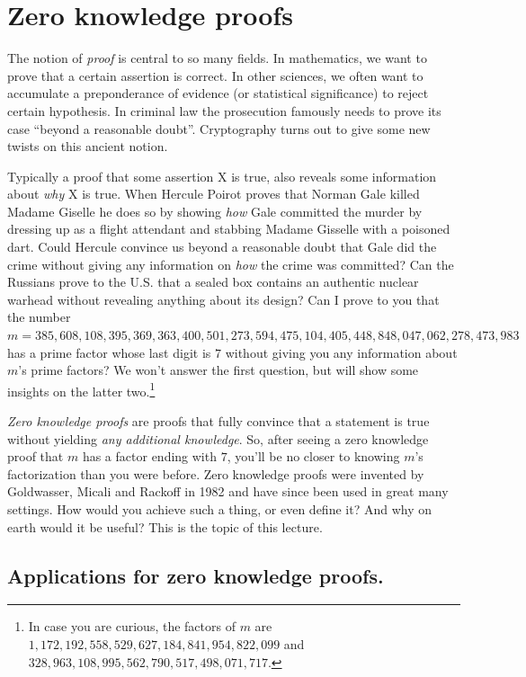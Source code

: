 \chapter{Zero knowledge proofs}\label{13-Zero-knowledge-proofs}

The notion of \emph{proof} is central to so many fields. In mathematics,
we want to prove that a certain assertion is correct. In other sciences,
we often want to accumulate a preponderance of evidence (or statistical
significance) to reject certain hypothesis. In criminal law the
prosecution famously needs to prove its case ``beyond a reasonable
doubt''. Cryptography turns out to give some new twists on this ancient
notion.

Typically a proof that some assertion X is true, also reveals some
information about \emph{why} X is true. When Hercule Poirot proves that
Norman Gale killed Madame Giselle he does so by showing \emph{how} Gale
committed the murder by dressing up as a flight attendant and stabbing
Madame Gisselle with a poisoned dart. Could Hercule convince us beyond a
reasonable doubt that Gale did the crime without giving any information
on \emph{how} the crime was committed? Can the Russians prove to the
U.S. that a sealed box contains an authentic nuclear warhead without
revealing anything about its design? Can I prove to you that the number
\(m=385,608,108,395,369,363,400,501,273,594,475,104,405,448,848,047,062,278,473,983\)
has a prime factor whose last digit is \(7\) without giving you any
information about \(m\)'s prime factors? We won't answer the first
question, but will show some insights on the latter two.\footnote{In
  case you are curious, the factors of \(m\) are
  \(1,172,192,558,529,627,184,841,954,822,099\) and
  \(328,963,108,995,562,790,517,498,071,717\).}

\emph{Zero knowledge proofs} are proofs that fully convince that a
statement is true without yielding \emph{any additional knowledge}. So,
after seeing a zero knowledge proof that \(m\) has a factor ending with
\(7\), you'll be no closer to knowing \(m\)'s factorization than you
were before. Zero knowledge proofs were invented by Goldwasser, Micali
and Rackoff in 1982 and have since been used in great many settings. How
would you achieve such a thing, or even define it? And why on earth
would it be useful? This is the topic of this lecture.

\section{Applications for zero knowledge
proofs.}\label{13-Applications-for-zero-}

